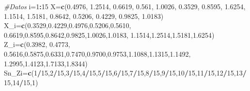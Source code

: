 \documentclass[
  a4paper,
  oneside,
  openany]{book}
\newenvironment{Shaded}{\begin{snugshade}}{\end{snugshade}}
\newcommand{\CommentTok}[1]{\textcolor[rgb]{0.56,0.35,0.01}{\textit{#1}}}
\newcommand{\DecValTok}[1]{\textcolor[rgb]{0.00,0.00,0.81}{#1}}
\newcommand{\FloatTok}[1]{\textcolor[rgb]{0.00,0.00,0.81}{#1}}
\newcommand{\FunctionTok}[1]{\textcolor[rgb]{0.13,0.29,0.53}{\textbf{#1}}}
\newcommand{\NormalTok}[1]{#1}
\newcommand{\OtherTok}[1]{\textcolor[rgb]{0.56,0.35,0.01}{#1}}
\newcommand{\SpecialCharTok}[1]{\textcolor[rgb]{0.81,0.36,0.00}{\textbf{#1}}}
\begin{document}
\begin{Shaded}
\begin{Highlighting}[]
\CommentTok{\#Datos}
\NormalTok{i}\OtherTok{=}\DecValTok{1}\SpecialCharTok{:}\DecValTok{15}
\NormalTok{X}\OtherTok{=}\FunctionTok{c}\NormalTok{(}\FloatTok{0.4976}\NormalTok{, }\FloatTok{1.2514}\NormalTok{, }\FloatTok{0.6619}\NormalTok{, }\FloatTok{0.561}\NormalTok{, }\FloatTok{1.0026}\NormalTok{, }\FloatTok{0.3529}\NormalTok{, }\FloatTok{0.8595}\NormalTok{, }\FloatTok{1.6254}\NormalTok{,}
                             \FloatTok{1.1514}\NormalTok{, }\FloatTok{1.5181}\NormalTok{, }\FloatTok{0.8642}\NormalTok{, }\FloatTok{0.5206}\NormalTok{, }\FloatTok{0.4229}\NormalTok{, }\FloatTok{0.9825}\NormalTok{, }\FloatTok{1.0183}\NormalTok{)}
\NormalTok{X\_i}\OtherTok{=}\FunctionTok{c}\NormalTok{(}\FloatTok{0.3529}\NormalTok{,}\FloatTok{0.4229}\NormalTok{,}\FloatTok{0.4976}\NormalTok{,}\FloatTok{0.5206}\NormalTok{,}\FloatTok{0.5610}\NormalTok{, }\FloatTok{0.6619}\NormalTok{,}\FloatTok{0.8595}\NormalTok{,}\FloatTok{0.8642}\NormalTok{,}\FloatTok{0.9825}\NormalTok{,}\FloatTok{1.0026}\NormalTok{,}\FloatTok{1.0183}\NormalTok{,}
      \FloatTok{1.1514}\NormalTok{,}\FloatTok{1.2514}\NormalTok{,}\FloatTok{1.5181}\NormalTok{,}\FloatTok{1.6254}\NormalTok{)}
\NormalTok{Z\_i}\OtherTok{=}\FunctionTok{c}\NormalTok{(}\FloatTok{0.3982}\NormalTok{, }\FloatTok{0.4773}\NormalTok{, }\FloatTok{0.5616}\NormalTok{,}\FloatTok{0.5875}\NormalTok{,}\FloatTok{0.6331}\NormalTok{,}\FloatTok{0.7470}\NormalTok{,}\FloatTok{0.9700}\NormalTok{,}\FloatTok{0.9753}\NormalTok{,}\FloatTok{1.1088}\NormalTok{,}\FloatTok{1.1315}\NormalTok{,}\FloatTok{1.1492}\NormalTok{,}
      \FloatTok{1.2995}\NormalTok{,}\FloatTok{1.4123}\NormalTok{,}\FloatTok{1.7133}\NormalTok{,}\FloatTok{1.8344}\NormalTok{) }
\NormalTok{Sn\_Zi}\OtherTok{=}\FunctionTok{c}\NormalTok{(}\DecValTok{1}\SpecialCharTok{/}\DecValTok{15}\NormalTok{,}\DecValTok{2}\SpecialCharTok{/}\DecValTok{15}\NormalTok{,}\DecValTok{3}\SpecialCharTok{/}\DecValTok{15}\NormalTok{,}\DecValTok{4}\SpecialCharTok{/}\DecValTok{15}\NormalTok{,}\DecValTok{5}\SpecialCharTok{/}\DecValTok{15}\NormalTok{,}\DecValTok{6}\SpecialCharTok{/}\DecValTok{15}\NormalTok{,}\DecValTok{7}\SpecialCharTok{/}\DecValTok{15}\NormalTok{,}\DecValTok{8}\SpecialCharTok{/}\DecValTok{15}\NormalTok{,}\DecValTok{9}\SpecialCharTok{/}\DecValTok{15}\NormalTok{,}\DecValTok{10}\SpecialCharTok{/}\DecValTok{15}\NormalTok{,}\DecValTok{11}\SpecialCharTok{/}\DecValTok{15}\NormalTok{,}\DecValTok{12}\SpecialCharTok{/}\DecValTok{15}\NormalTok{,}\DecValTok{13}\SpecialCharTok{/}\DecValTok{15}\NormalTok{,}\DecValTok{14}\SpecialCharTok{/}\DecValTok{15}\NormalTok{,}\DecValTok{1}\NormalTok{)}

\end{Highlighting}
\end{Shaded}
\end{document}
